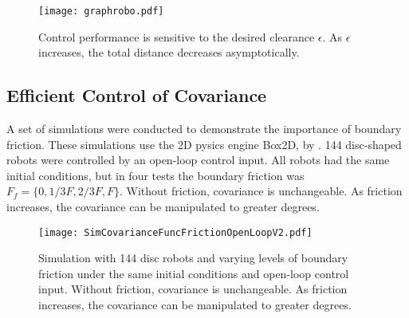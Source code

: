 \begin{figure}
\begin{center}
	\texttt{[image: graphrobo.pdf]}
\end{center}
\caption{\label{fig:graphrobo.pdf}
Control performance is sensitive to the desired clearance $\epsilon$.  As $\epsilon$ increases, the total distance decreases asymptotically.
}
\end{figure}

\subsection{Efficient Control of Covariance}
A set of simulations were conducted to demonstrate the importance of boundary friction.  These simulations use  the 2D pysics engine Box2D, by \citet{catto2010box2d}.
 144 disc-shaped robots were controlled by an open-loop control input.  All robots had  the same initial conditions, but in four tests the boundary friction was $F_f = \{0,1/3 F, 2/3F, F\}$.
 Without friction, covariance is unchangeable.  As friction increases, the covariance can be manipulated to greater degrees.


\begin{figure}
\begin{center}
	\texttt{[image: SimCovarianceFuncFrictionOpenLoopV2.pdf]}
\end{center}
\caption{\label{fig:SimCovarianceFuncFrictionOpenLoop}
Simulation with 144 disc robots and varying levels of boundary friction under the same initial conditions and open-loop control input.  Without friction, covariance is unchangeable.  As friction increases, the covariance can be manipulated to greater degrees.
}
\end{figure}




